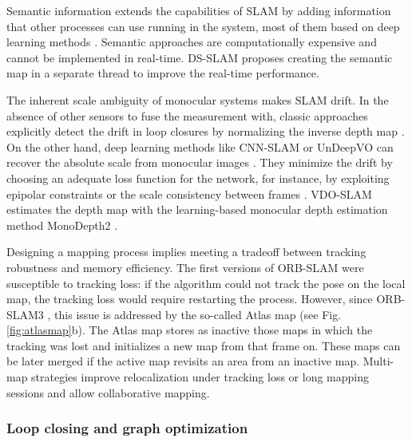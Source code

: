 Semantic information extends the capabilities of SLAM by adding information that other processes can use running in the system, most of them based on deep learning methods \cite{tateno2017cnnslam,liu2021rds-slam,yang2019cubeslam,bavle2020vps-slam,cui2019sof-slam,dynaslam18}. Semantic approaches are computationally expensive and cannot be implemented in real-time. DS-SLAM \cite{yu2018ds-slam} proposes creating the semantic map in a separate thread to improve the real-time performance.

The inherent scale ambiguity of monocular systems makes SLAM drift. In the absence of other sensors to fuse the measurement with, classic approaches explicitly detect the drift in loop closures by normalizing the inverse depth map \cite{engel2014lsd}\cite{campos2021orb}. On the other hand, deep learning methods like CNN-SLAM \cite{tateno2017cnnslam} or UnDeepVO \cite{li2018undeepvo} can recover the absolute scale from monocular images\cite{czarnowski2020deepfactors} \cite{greene2020metrically}. They minimize the drift by choosing an adequate loss function for the network, for instance, by exploiting epipolar constraints \cite{godard2017unsupervisedleftrightconsistency} or the scale consistency between frames \cite{bian2019unsuperviseddepthconsistency}.
VDO-SLAM \cite{zhang2020vdo} estimates the depth map with the learning-based monocular depth estimation method MonoDepth2 \cite{godard2019monodepth2}.



Designing a mapping process implies meeting a tradeoff between tracking robustness and memory efficiency.
The first versions of ORB-SLAM were susceptible to tracking loss: if the algorithm could not track the pose on the local map, the tracking loss would require restarting the process. However, since ORB-SLAM3 \cite{campos2021orb}, this issue is addressed by the so-called Atlas map (see Fig. \ref{fig:atlasmap}b). The Atlas map stores as inactive those maps in which the tracking was lost and initializes a new map from that frame on.  
These maps can be later merged if the active map revisits an area from an inactive map. 
Multi-map strategies improve relocalization under tracking loss or long mapping sessions and allow collaborative mapping.


\subsubsection{Loop closing and graph optimization}
\label{sec:backend:loopclosingandgraphopt}


